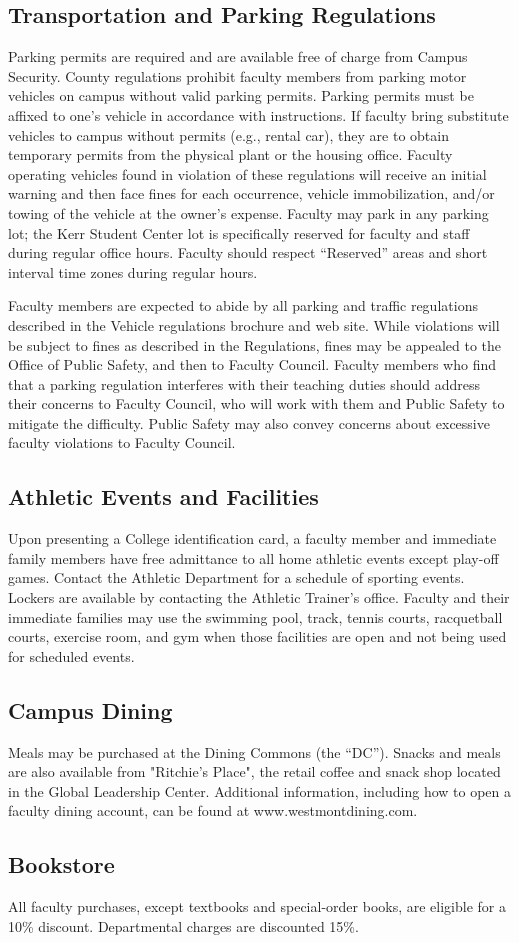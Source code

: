 	\subsection{Transportation and Parking Regulations}

		Parking permits are required and are available free of charge from Campus Security.  County regulations prohibit faculty members from parking motor vehicles on campus without valid parking permits.  Parking permits must be affixed to one's vehicle in accordance with instructions.  If faculty bring substitute vehicles to campus without permits (e.g., rental car), they are to obtain temporary permits from the physical plant or the housing office.  Faculty operating vehicles found in violation of these regulations will receive an initial warning and then face fines for each occurrence, vehicle immobilization, and/or towing of the vehicle at the owner's expense.  Faculty may park in any parking lot; the Kerr Student Center lot is specifically reserved for faculty and staff during regular office hours.  Faculty should respect ``Reserved'' areas and short interval time zones during regular hours.

		Faculty members are expected to abide by all parking and traffic regulations described in the Vehicle regulations brochure and web site.  While violations will be subject to fines as described in the Regulations, fines may be appealed to the Office of Public Safety, and then to Faculty Council.  Faculty members who find that a parking regulation interferes with their teaching duties should address their concerns to Faculty Council, who will work with them and Public Safety to mitigate the difficulty.  Public Safety may also convey concerns about excessive faculty violations to Faculty Council.
	\subsection{ Athletic Events and Facilities}
		Upon presenting a College identification card, a faculty member and immediate family members have free admittance to all home athletic events except play-off games.  Contact the Athletic Department for a schedule of sporting events.  Lockers are available by contacting the Athletic Trainer's office.  Faculty and their immediate families may use the swimming pool, track, tennis courts, racquetball courts, exercise room, and gym when those facilities are open and not being used for scheduled events.
	\subsection{ Campus Dining}
		Meals may be purchased at the Dining Commons (the ``DC'').  Snacks and meals are also available from "Ritchie's Place", the retail coffee and snack shop located in the Global Leadership Center.  Additional information, including how to open a faculty dining account, can be found at www.westmontdining.com.
	\subsection{ Bookstore}
		All faculty purchases, except textbooks and special-order books, are eligible
		for a 10\% discount.  Departmental charges are discounted 15\%.
